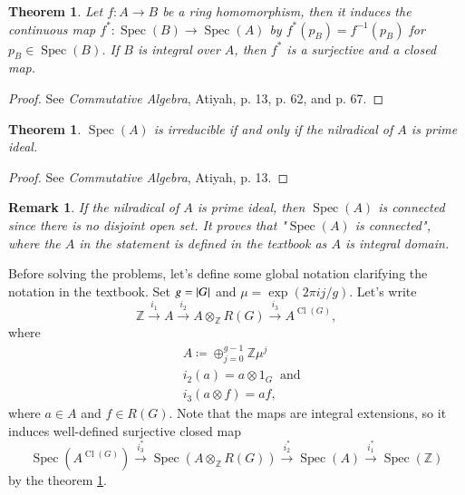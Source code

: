 \documentclass[a4paper, 12pt]{article}
\theoremstyle{Mydefinition}
\newtheorem{remark}[statement]{Remark}
\theoremstyle{Mytheorem}
\newtheorem{theorem}[statement]{Theorem}
\DeclareMathOperator{\cl}{Cl}
\DeclareMathOperator{\Spec}{Spec}
\begin{document}
\begin{theorem}\label{HW11:TH:2}
Let $f:A\rightarrow B$ be a ring homomorphism, then it induces the continuous map $f^*:\Spec(B)\rightarrow \Spec(A)$ by $f^*(p_B) = f^{-1}(p_B)$ for $p_B\in \Spec(B)$. If $B$ is integral over $A$, then $f^*$ is a surjective and a closed map.
\end{theorem}
\begin{proof}
See \textit{Commutative Algebra}, Atiyah, p. 13, p. 62, and p. 67.
\end{proof}
\begin{theorem}\label{HW11:TH:3}
$\Spec(A)$ is irreducible if and only if the nilradical of $A$ is prime ideal.
\end{theorem}
\begin{proof}
See \textit{Commutative Algebra}, Atiyah, p. 13.
\end{proof}
\begin{remark}\label{HW11:RM:1}
If the nilradical of $A$ is prime ideal, then $\Spec(A)$ is connected since there is no disjoint open set. It proves that "$\Spec(A)$ is connected", where the $A$ in the statement is defined in the textbook as $A$ is integral domain.
\end{remark}

Before solving the problems, let's define some global notation clarifying the notation in the textbook. Set $g=\abs{G}$ and $\mu = \exp(2\pi ij/g)$. Let's write 
\begin{equation}\label{HW11:Eq:1}
    \mathbb{Z}\xrightarrow{i_1} A\xrightarrow{i_2}A\otimes_{\mathbb{Z}} R(G)\xrightarrow{i_3}A^{\cl(G)},
\end{equation}
where
\begin{equation}
\begin{split}
    &A \coloneqq \oplus_{j=0}^{g-1} \mathbb{Z}\mu^j\\
    &i_2(a) = a\otimes 1_G~\textrm{ and}\\
    &i_3(a\otimes f) = af,
\end{split}
\end{equation}
where $a\in A$ and $f\in R(G)$. Note that the maps are integral extensions, so it induces well-defined surjective closed map
\begin{equation}
    \Spec(A^{\cl(G)})\xrightarrow{i^*_3}\Spec(A\otimes_{\mathbb{Z}} R(G))\xrightarrow{i^*_2}\Spec(A)\xrightarrow{i_1^*}\Spec(\mathbb{Z})
\end{equation}
by the theorem \ref{HW11:TH:2}.
\end{document}
